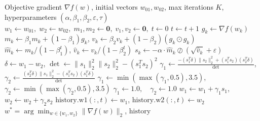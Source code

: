 \documentclass[11pt,a4paper]{article}
\begin{document}
\begin{algorithm}[H]
\caption{Twin-Modulated ADAM Optimizer}\label{alg:adam_twin}
\begin{algorithmic}[1]
\Require Objective gradient $\nabla f(w)$, initial vectors $w_{01}, w_{02}$, max iterations $K$, hyperparameters $(\alpha, \beta_1, \beta_2, \varepsilon, \tau)$
\State $w_1 \leftarrow w_{01}, \; w_2 \leftarrow w_{02}, \; m_1, m_2 \leftarrow \mathbf{0}, \; v_1, v_2 \leftarrow \mathbf{0}, \; t \leftarrow 0$
    \State $t \leftarrow t + 1$
        \State $g_k \leftarrow \nabla f(w_k)$
        \State $m_k \leftarrow \beta_1 m_k + (1 - \beta_1) g_k$, \quad $v_k \leftarrow \beta_2 v_k + (1 - \beta_2)(g_k \odot g_k)$ 
        \State $\hat{m}_k \leftarrow m_k / (1 - \beta_1^t)$, \quad $\hat{v}_k \leftarrow v_k / (1 - \beta_2^t)$ 
        \State $s_k \leftarrow -\alpha \cdot \hat{m}_k \oslash (\sqrt{\hat{v}_k} + \varepsilon)$ 
    \EndFor
    \State $\delta \leftarrow w_1 - w_2$, \quad $\det \leftarrow \|s_1\|_2^2 \|s_2\|_2^2 - (s_1^T s_2)^2$
        \State $\gamma_1 \leftarrow \frac{-(s_1^T \delta)\|s_2\|_2^2 + (s_1^T s_2)(s_2^T \delta)}{\det}$, \quad $\gamma_2 \leftarrow \frac{(s_2^T \delta)\|s_1\|_2^2 - (s_1^T s_2)(s_1^T \delta)}{\det}$
        \State $\gamma_1 \leftarrow \min(\max(\gamma_1, 0.5), 3.5)$, \quad $\gamma_2 \leftarrow \min(\max(\gamma_2, 0.5), 3.5)$ 
    \Else
        \State $\gamma_1 \leftarrow 1.0, \quad \gamma_2 \leftarrow 1.0$ 
    \EndIf
    \State $w_1 \leftarrow w_1 + \gamma_1 s_1$, \quad $w_2 \leftarrow w_2 + \gamma_2 s_2$ 
    \State $\text{history.w1}(:,t) \leftarrow w_1$, \quad $\text{history.w2}(:,t) \leftarrow w_2$
\EndWhile
\State \Return $w^* = \arg\min_{w \in \{w_1, w_2\}} \|\nabla f(w)\|_2$, $\text{history}$
\end{algorithmic}
\end{algorithm}
\end{document}
